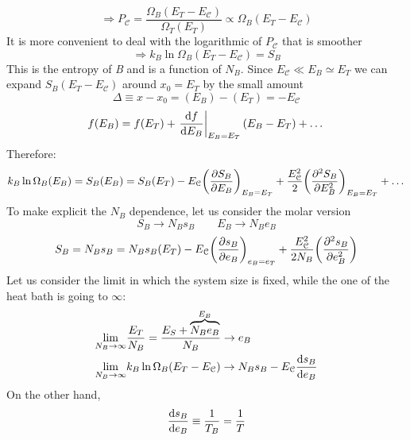 \documentclass[../main/main.tex]{subfiles}
\begin{document}
\begin{equation}
  \Rightarrow   P_{\mathcal{C} }= \frac{\Omega _B (E_T - E_{\mathcal{C} })}{\Omega _T (E_T)} \propto \Omega _B (E_T - E_{\mathcal{C} })
\end{equation}
It is more convenient to deal with the logarithmic of \( P_{\mathcal{C} } \) that is smoother
\begin{equation}
  \Rightarrow k_B \ln{\Omega _B (E_T - E_{\mathcal{C} })} = S_B
\end{equation}
This is the entropy of \emph{B} and is a function of \( N_B \). Since \( E_{\mathcal{C}} \ll E_B \simeq E_T \) we can expand \( S_B (E_T - E_{\mathcal{C} }) \) around \( x_0 = E_T \) by the small amount
\begin{equation*}
  \Delta \equiv x-x_0 = (E_B) - (E_T) = - E_{\mathcal{C} }
\end{equation*}
\begin{equation*}
  f(E_B) = f(E_T) +  \eval{\dv{f}{E_B}}_{E_B = E_T} (E_B-E_T) + \dots
\end{equation*}
Therefore:
\begin{equation}
  k_B \ln{\Omega _B (E_B) } = S_B (E_B) = S_B (E_T) - E_{\mathcal{C} } \qty(\pdv{S_B}{E_B} )_{E_B = E_T} + \frac{E^2_{\mathcal{C} }}{2} \qty( \pdv[2]{S_B}{E_B} )_{E_B =E_T} + \dots
\end{equation}
To make explicit the \( N_B \) dependence, let us consider the molar version
\begin{equation*}
  S_B \rightarrow N_B s_B \qquad
  E_B \rightarrow N_B e_B
\end{equation*}
\begin{equation*}
  S_B =  N_B s_B = N_B s_B (E_T) - E_{\mathcal{C}} \qty(\pdv{s_B}{e_B} )_{e_B=e_T} + \frac{E_{\mathcal{C}}^2}{2 N_B}  \qty(\pdv[2]{s_B}{e_B} )
\end{equation*}
Let us consider the limit in which the system size is fixed, while the one of the heat bath is going to \( \infty  \):
\begin{subequations}
\begin{align}
  \lim_{N_B \rightarrow \infty } & \frac{E_T}{N_B} = \frac{E_S+ 
  \overbrace{N_B e_B}^{E_B}}{N_B} \rightarrow e_B \\
  \lim_{N_B \rightarrow \infty } & k_B \ln{\Omega _B (E_T - E_{\mathcal{C}})} \rightarrow N_B s_B - E_{\mathcal{C}} \dv{s_B}{e_B}
\end{align}
\end{subequations}
On the other hand,
\begin{equation*}
  \dv{s_B}{e_B} \equiv \frac{1}{T_B} = \frac{1}{T}
\end{equation*}
\end{document}
